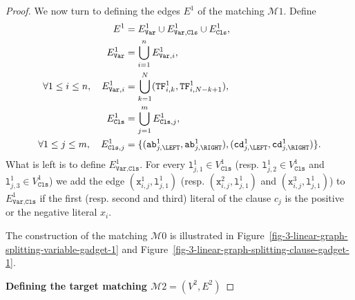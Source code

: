 \begin{proof}
    We now turn to defining the edges $E^{1}$ of the matching $\mathcal{M}{1}$.
    Define
    \begin{align*}
      E^{1} &= E^{1}_{\texttt{Var}} \cup E^{1}_{\texttt{Var},\texttt{Cls}} \cup E^{1}_{\texttt{Cls}},
      \\
      E^{1}_{\texttt{Var}} &= \bigcup_{i=1}^{n} E^{1}_{\texttt{Var}, i},
      \\
      \forall 1\leq i \leq n,\quad
      E^{1}_{\texttt{Var}, i} &= \bigcup_{k=1}^{N} (\texttt{TF}^{1}_{i,k}, \texttt{TF}^{1}_{i,N-k+1}),
      \\
      E^{1}_{\texttt{Cls}} &= \bigcup_{j=1}^{m} E^{1}_{\texttt{Cls}, j},
      \\
      \forall 1\leq j \leq m,\quad
      E^{1}_{\texttt{Cls}, j} &=
      \{
      (\texttt{ab}^{1}_{j,\LEFT}, \texttt{ab}^{1}_{j,\RIGHT}),
      (\texttt{cd}^{1}_{j,\LEFT}, \texttt{cd}^{1}_{j,\RIGHT})
      \}\text{.}
    \end{align*}
    What is left is to define $E^{1}_{\texttt{Var},\texttt{Cls}}$.
    For every $\texttt{l}^{1}_{j, 1} \in V^{1}_{\texttt{Cls}}$
    (resp. $\texttt{l}^{1}_{j, 2} \in V^{1}_{\texttt{Cls}}$ and
    $\texttt{l}^{1}_{j, 3} \in V^{1}_{\texttt{Cls}}$)
    we add
    the edge $(\texttt{x}^{1}_{i,j}, \texttt{l}^{1}_{j, 1})$
    (resp. $(\texttt{x}^{2}_{i,j}, \texttt{l}^{1}_{j, 1})$ and
    $(\texttt{x}^{3}_{i,j}, \texttt{l}^{1}_{j, 1})$)
    to $E^{1}_{\texttt{Var},\texttt{Cls}}$
    if the first (resp. second and third) literal of the clause $c_{j}$
    is the positive or the negative literal $x_{i}$.

  The construction of the matching $\mathcal{M}{0}$ is illustrated
  in Figure~\ref{fig-3-linear-graph-splitting-variable-gadget-1} and
  Figure~\ref{fig-3-linear-graph-splitting-clause-gadget-1}.

  

  

  \medskip
  \textbf{Defining the target matching $\mathcal{M}{2} = (V^{2}, E^{2})$}
  \medskip


\end{proof}
